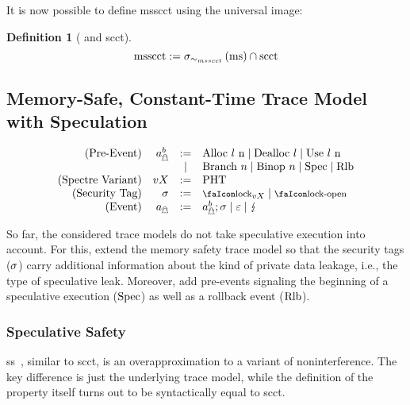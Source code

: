 \documentclass[dvipsnames,conference]{IEEEtran}
\theoremstyle{definition}
\newtheorem{definition}{Definition}[section]
\begin{document}
It is now possible to define \gls*{msscct} using the universal image:


\begin{definition}[ and \gls*{scct}]\label{def:trace:msscctdef}
  \[
  \operatorname{msscct}:=\sigma_{\sim_{msscct}}\left(\operatorname{ms}\right)\cap\operatorname{scct}
  \]
\end{definition}

\subsection{Memory-Safe, Constant-Time Trace Model with Speculation}\label{subsec:msctss:tracemodel}

\[
  \begin{array}{rrcl}
    (\text{Pre-Event}) & \event[^b_{\mathghost}] &:=& \ev{Alloc \loc\ n} \mid \ev{Dealloc \loc} \mid \ev{Use \loc\ n}\\
                       &&\mid& \ev{Branch\ }n \mid \ev{Binop\ }n \mid \ev{Spec} \mid \ev{Rlb}\\
    (\text{Spectre Variant}) & vX &:=& \operatorname{PHT} \\
    (\text{Security Tag}) & \securitytag &:=& \lock_{vX} \mid \unlock\\ 
    (\text{Event}) & \event[_{\mathghost}] &:=& \event[^b_{\mathghost}];\securitytag \mid \emptyevent \mid \lightning \\ 
  \end{array}
\]

So far, the considered trace models do not take speculative execution into account. 
For this, extend the memory safety trace model so that the security tags ($\sigma$) carry additional information about the kind of private data leakage, i.e., the type of speculative leak.
Moreover, add pre-events signaling the beginning of a speculative execution ($\text{Spec}$) as well as a rollback event ($\text{Rlb}$).

\subsubsection{Speculative Safety}

\gls*{ss}~\cite{patrignani2021exorcising}, similar to \gls*{scct}, is an overapproximation to a variant of noninterference.
The key difference is just the underlying trace model, while the definition of the property itself turns out to be syntactically equal to \gls*{scct}.
\end{document}

